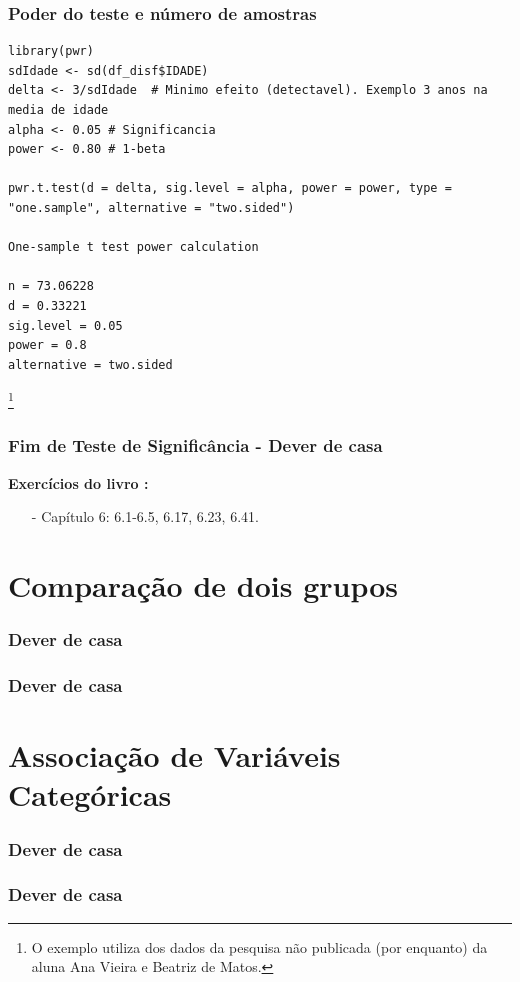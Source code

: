 \documentclass[graphics,14pt]{beamer}
\newcommand{\lfr}[1]{\let\thefootnote\relax\footnote{\hspace{0.6cm}\vspace{1.25cm} #1}}
\begin{document}
\begin{frame}[t,fragile=singleslide]
\frametitle{Poder do teste e número de amostras}

\begin{lstlisting}
library(pwr)
sdIdade <- sd(df_disf$IDADE)
delta <- 3/sdIdade  # Minimo efeito (detectavel). Exemplo 3 anos na media de idade
alpha <- 0.05 # Significancia
power <- 0.80 # 1-beta

pwr.t.test(d = delta, sig.level = alpha, power = power, type = "one.sample", alternative = "two.sided")

One-sample t test power calculation 

n = 73.06228
d = 0.33221
sig.level = 0.05
power = 0.8
alternative = two.sided
\end{lstlisting}

\lfr{O exemplo utiliza dos dados da pesquisa não publicada (por enquanto) da aluna Ana Vieira e Beatriz de Matos.}

\end{frame}
\begin{frame}[t,fragile=singleslide]
\frametitle{Fim de Teste de Significância - Dever de casa}
\textbf{Exercícios do livro \cite{Agresti2018}:}
\begin{itemize}
	\item[-] Capítulo 6: 6.1-6.5, 6.17, 6.23, 6.41.
\end{itemize}
\end{frame}
\section{Comparação de dois grupos}
\begin{frame}[t,fragile=singleslide]
\frametitle{Dever de casa}
\end{frame}
\begin{frame}[t,fragile=singleslide]
\frametitle{Dever de casa}
\end{frame}
\section{Associação de Variáveis Categóricas}
\begin{frame}[t,fragile=singleslide]
\frametitle{Dever de casa}
\end{frame}
\begin{frame}[t,fragile=singleslide]
\frametitle{Dever de casa}
\end{frame}
\end{document}
